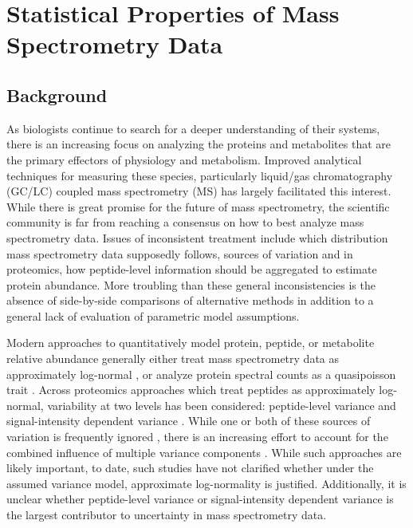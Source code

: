 \section{Statistical Properties of Mass Spectrometry Data}

\subsection{Background}

As biologists continue to search for a deeper understanding of their systems, there is an increasing focus on analyzing the proteins and metabolites that are the primary effectors of physiology and metabolism. Improved analytical techniques for measuring these species, particularly liquid/gas chromatography (GC/LC) coupled mass spectrometry (MS) has largely facilitated this interest. While there is great promise for the future of mass spectrometry, the scientific community is far from reaching a consensus on how to best analyze mass spectrometry data.  Issues of inconsistent treatment include which distribution mass spectrometry data supposedly follows, sources of variation and in proteomics, how peptide-level information should be aggregated to estimate protein abundance. More troubling than these general inconsistencies is the absence of side-by-side comparisons of alternative methods in addition to a general lack of evaluation of parametric model assumptions. 

Modern approaches to quantitatively model protein, peptide, or metabolite relative abundance generally either treat mass spectrometry data as approximately log-normal \cite{Cox:2008ir, Oberg:2012bm,Navarro:2014ke, Breunig:2014bu}, or analyze protein spectral counts as a quasipoisson trait \cite{Li:2010bj}. Across proteomics approaches which treat peptides as approximately log-normal, variability at two levels has been considered: peptide-level variance \cite{Navarro:2014ke} and signal-intensity dependent variance \cite{Zhu:2011jr,Oberg:2012bm,Navarro:2014ke}. While one or both of these sources of variation is frequently ignored \cite{Oberg:2012bm}, there is an increasing effort to account for the combined influence of multiple variance components \cite{Navarro:2014ke}. While such approaches are likely important, to date, such studies have not clarified whether under the assumed variance model, approximate log-normality is justified. Additionally, it is unclear whether peptide-level variance or signal-intensity dependent variance is the largest contributor to uncertainty in mass spectrometry data.

